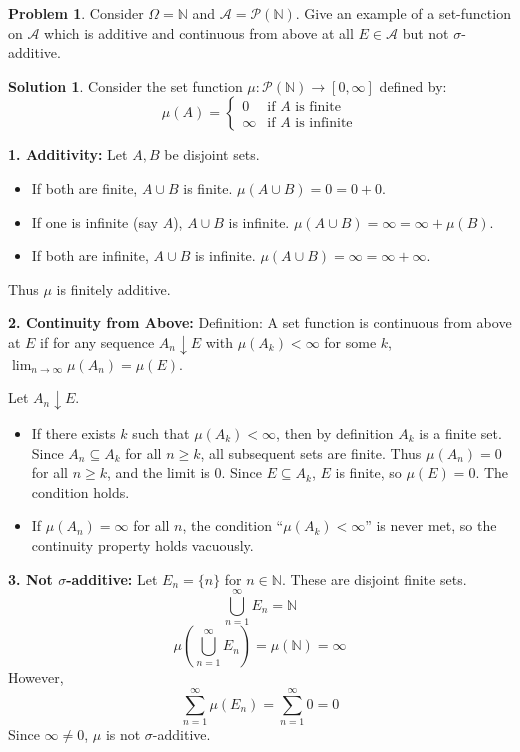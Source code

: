 \documentclass{article}
\theoremstyle{definition}
\newtheorem{problem}{Problem}
\newtheorem*{solution}{Solution}
\begin{document}
\hrulefill

\begin{problem}
Consider $\Omega = \mathbb{N}$ and $\mathcal{A} = \mathcal{P}(\mathbb{N})$. Give an example of a set-function on $\mathcal{A}$ which is additive and continuous from above at all $E \in \mathcal{A}$ but not $\sigma$-additive.
\end{problem}

\begin{solution}
Consider the set function $\mu: \mathcal{P}(\mathbb{N}) \to [0, \infty]$ defined by:
\[ \mu(A) = \begin{cases} 0 & \text{if } A \text{ is finite} \\ \infty & \text{if } A \text{ is infinite} \end{cases} \]

\textbf{1. Additivity:}
Let $A, B$ be disjoint sets.
\begin{itemize}
    \item If both are finite, $A \cup B$ is finite. $\mu(A \cup B) = 0 = 0+0$.
    \item If one is infinite (say $A$), $A \cup B$ is infinite. $\mu(A \cup B) = \infty = \infty + \mu(B)$.
    \item If both are infinite, $A \cup B$ is infinite. $\mu(A \cup B) = \infty = \infty + \infty$.
\end{itemize}
Thus $\mu$ is finitely additive.

\textbf{2. Continuity from Above:}
Definition: A set function is continuous from above at $E$ if for any sequence $A_n \downarrow E$ with $\mu(A_k) < \infty$ for some $k$, $\lim_{n \to \infty} \mu(A_n) = \mu(E)$.

Let $A_n \downarrow E$.
\begin{itemize}
    \item If there exists $k$ such that $\mu(A_k) < \infty$, then by definition $A_k$ is a finite set. Since $A_n \subseteq A_k$ for all $n \ge k$, all subsequent sets are finite. Thus $\mu(A_n) = 0$ for all $n \ge k$, and the limit is 0. Since $E \subseteq A_k$, $E$ is finite, so $\mu(E) = 0$. The condition holds.
    \item If $\mu(A_n) = \infty$ for all $n$, the condition ``$\mu(A_k) < \infty$'' is never met, so the continuity property holds vacuously.
\end{itemize}

\textbf{3. Not $\sigma$-additive:}
Let $E_n = \{n\}$ for $n \in \mathbb{N}$. These are disjoint finite sets.
\[ \bigcup_{n=1}^\infty E_n = \mathbb{N} \]
\[ \mu\left(\bigcup_{n=1}^\infty E_n\right) = \mu(\mathbb{N}) = \infty \]
However,
\[ \sum_{n=1}^\infty \mu(E_n) = \sum_{n=1}^\infty 0 = 0 \]
Since $\infty \neq 0$, $\mu$ is not $\sigma$-additive.
\end{solution}
\end{document}
